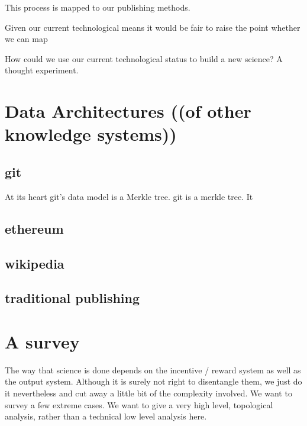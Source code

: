 \documentclass[14pt]{article}
\newcommand{\remark}[1]{{\color{purple} (#1)}}
\begin{document}
This process is mapped to our publishing methods.

Given our current technological means it would be fair to raise the point whether we can map 


How could we use our current technological status to build a new science? A thought experiment.


\section{Data Architectures \remark{(of other knowledge systems)}}

\subsection{git}
At its heart git's data model is a Merkle tree. 
git is a merkle tree. It 


\subsection{ethereum}

\subsection{wikipedia}

\subsection{traditional publishing}




\section{A survey}

The way that science is done depends on the incentive / reward system as well as the output system. Although it is surely not right to disentangle them, we just do it nevertheless and cut away a little bit of the complexity involved. We want to survey a few extreme cases. We want to give a very high level, topological analysis, rather than a technical low level analysis here. 
\end{document}
